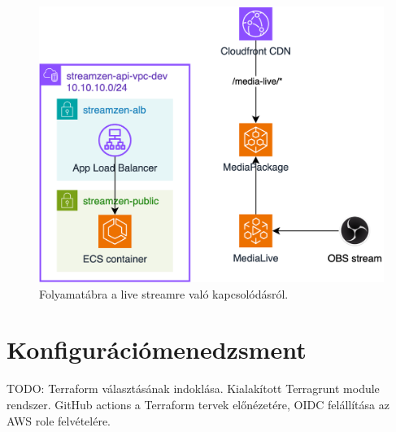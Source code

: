 \begin{figure}[ht]
	\centering
	\includegraphics[width=120mm, keepaspectratio]{figures/dipterv_live2.png}
	\caption{Folyamatábra a live streamre való kapcsolódásról.}
	\label{fig:live2}
\end{figure}

\section{Konfigurációmenedzsment}

TODO: Terraform választásának indoklása. Kialakított Terragrunt module rendszer. GitHub actions a Terraform tervek előnézetére, OIDC felállítása az AWS role felvételére.
